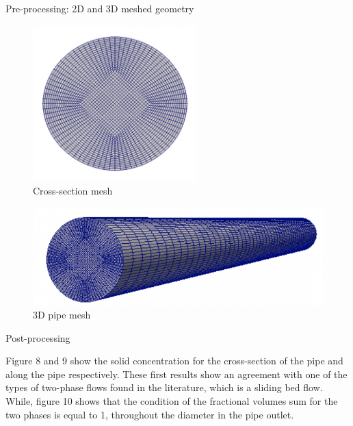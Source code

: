 \documentclass[review,3p,times,12pt]{elsarticle}
\begin{document}
\begin{itemize}
   \bf{\item Pre-processing: 2D and 3D meshed geometry}
\end{itemize}
\vspace{0.5cm}
\begin{minipage}{0.45\textwidth}
 \begin{figure}[H]
   \begin{center}
    \includegraphics[trim=0cm 0cm 0cm 0cm,clip,scale=0.6]{1.png}
    \caption{ Cross-section mesh}
    \label{fig:gauss}
       \end{center}
\end{figure} 
\end{minipage}\hfill
\begin{minipage}{0.45\textwidth}
  \begin{figure}[H]
   \begin{center}
    \includegraphics[trim=0cm 0cm 0cm 0cm,clip,scale=0.6]{2.png}
    \caption{ 3D pipe mesh}
    \label{fig:gauss}
       \end{center}
\end{figure} 
\end{minipage}\vspace{0.5cm}
\begin{itemize}
 \bf{\item Post-processing}
\end{itemize}
Figure 8 and 9 show the solid concentration for the cross-section of the pipe and along the pipe respectively. These first results show an agreement with one of the types of two-phase flows found in the literature, which is a sliding bed flow. While, figure 10 shows that the condition of the fractional volumes sum for the two phases is equal to 1, throughout the diameter in the  pipe outlet.\\
\end{document}
